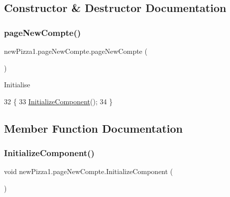 \subsection{Constructor \& Destructor Documentation}
\mbox{\label{classnewPizza1_1_1pageNewCompte_a482900bbedd1cfe0f7c2288a061699f9}} 
\subsubsection{\texorpdfstring{page\+New\+Compte()}{pageNewCompte()}}
{\footnotesize\ttfamily new\+Pizza1.\+page\+New\+Compte.\+page\+New\+Compte (\begin{DoxyParamCaption}{ }\end{DoxyParamCaption})\hspace{0.3cm}{\ttfamily [inline]}}



Initialise 


\begin{DoxyCode}
32         \{
33             \hyperlink{classnewPizza1_1_1pageNewCompte_a7469fdce60a25c385ac5b019b57a492a}{InitializeComponent}();
34         \}
\end{DoxyCode}


\subsection{Member Function Documentation}
\mbox{\label{classnewPizza1_1_1pageNewCompte_a7469fdce60a25c385ac5b019b57a492a}} 
\subsubsection{\texorpdfstring{Initialize\+Component()}{InitializeComponent()}\hspace{0.1cm}{\footnotesize\ttfamily [1/2]}}
{\footnotesize\ttfamily void new\+Pizza1.\+page\+New\+Compte.\+Initialize\+Component (\begin{DoxyParamCaption}{ }\end{DoxyParamCaption})\hspace{0.3cm}{\ttfamily [inline]}}



